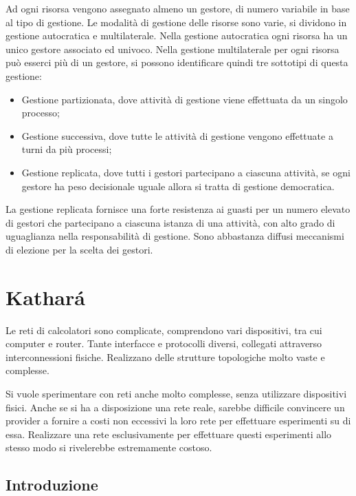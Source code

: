 \documentclass{article}
\numberwithin{equation}{subsection}
\begin{document}
Ad ogni risorsa vengono assegnato almeno un gestore, di numero variabile in base al tipo di gestione. 
Le modalità di gestione delle risorse sono varie, si dividono in gestione autocratica e multilaterale. Nella gestione autocratica ogni risorsa ha un unico gestore 
associato ed univoco. Nella gestione multilaterale per ogni risorsa può esserci più di un gestore, si possono identificare quindi tre sottotipi di questa gestione:
\begin{itemize}
  \item Gestione partizionata, dove attività di gestione viene effettuata da un singolo processo;
  \item Gestione successiva, dove tutte le attività di gestione vengono effettuate a turni da più processi;
  \item Gestione replicata, dove tutti i gestori partecipano a ciascuna attività, se ogni gestore ha peso decisionale uguale allora si tratta di gestione democratica. 
\end{itemize}

La gestione replicata fornisce una forte resistenza ai guasti per un numero elevato di gestori che partecipano a ciascuna istanza di una attività, con alto grado di 
uguaglianza nella responsabilità di gestione. Sono abbastanza diffusi meccanismi di elezione per la scelta dei gestori. 

\clearpage

\section{Kathar\'{a}}


Le reti di calcolatori sono complicate, comprendono vari dispositivi, tra cui computer e router. Tante interfacce e protocolli diversi, collegati attraverso interconnessioni fisiche. Realizzano delle strutture 
topologiche molto vaste e complesse. 


Si vuole sperimentare con reti anche molto complesse, senza utilizzare dispositivi fisici. 
Anche se si ha a disposizione una rete reale, sarebbe difficile convincere un provider a fornire a costi non eccessivi la loro rete per effettuare esperimenti su di essa. Realizzare una rete esclusivamente 
per effettuare questi esperimenti allo stesso modo si rivelerebbe estremamente costoso. 

\subsection{Introduzione}
\end{document}
